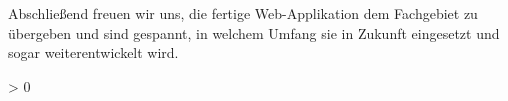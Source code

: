 \documentclass[
]{article}
\newlength{\cslhangindent}
\newenvironment{CSLReferences}[2] %
 {%
  \setlength{\parindent}{0pt}
  \ifodd #1 \everypar{\setlength{\hangindent}{\cslhangindent}}\ignorespaces\fi
  \ifnum #2 > 0
  \setlength{\parskip}{#2\baselineskip}
  \fi
 }%
 {}
\begin{document}
Abschließend freuen wir uns, die fertige Web-Applikation dem Fachgebiet zu übergeben und sind gespannt, in welchem Umfang sie in Zukunft eingesetzt und sogar weiterentwickelt wird.

\newpage{}


\hypertarget{refs}{}
\begin{CSLReferences}{0}{0}
\end{CSLReferences}

\printbibliography[heading=bibintoc, title=Literaturverzeichnis]

\printbibliography
\end{document}
